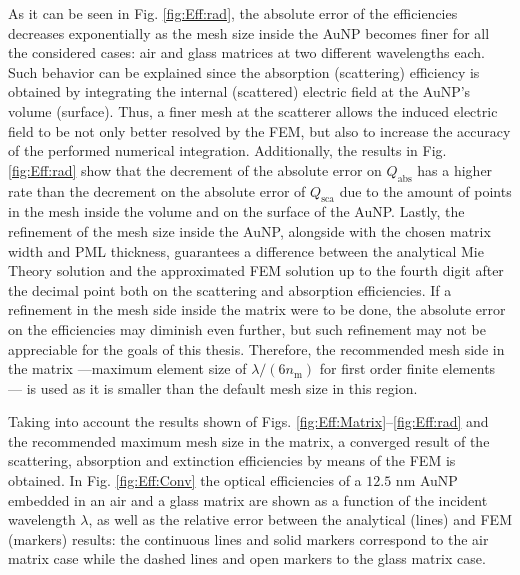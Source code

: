 As it can be seen in Fig. \ref{fig:Eff:rad}, the absolute error of the efficiencies decreases exponentially as the mesh size inside the AuNP becomes finer for all the considered cases: air and glass matrices at two different wavelengths each. Such behavior can be explained since the absorption (scattering) efficiency is obtained by integrating the internal (scattered) electric field at the AuNP's volume (surface). Thus, a finer mesh at the scatterer allows the induced electric field to be not only better resolved by the FEM, but also to increase the accuracy of the performed numerical integration. Additionally,  the results in Fig. \ref{fig:Eff:rad} show that the decrement of the absolute error on $Q_\text{abs}$ has a higher rate than the decrement on the absolute error of $Q_\text{sca}$ due to the amount of points in the mesh inside the volume and on the surface of the AuNP. Lastly, the refinement of the mesh size inside the AuNP, alongside with the chosen matrix width and PML thickness, guarantees a difference between the analytical Mie Theory solution and the approximated FEM solution up to the fourth digit after the decimal point both on the scattering and absorption efficiencies. If a refinement in the mesh side inside the matrix were to be done, the absolute error on the efficiencies may diminish even further, but such refinement may not be appreciable for the goals of this thesis. Therefore, the recommended mesh side in the matrix ---maximum element size of $\lambda/(6n_\text{m})$ for first order finite elements \cite{comsol_doc}--- is used as it is smaller than the default mesh size in this region.

Taking into account the results shown of Figs. \ref{fig:Eff:Matrix}--\ref{fig:Eff:rad} and the recommended maximum mesh size in the matrix, a converged result of the scattering, absorption and extinction efficiencies by means of the FEM is obtained. In Fig. \ref{fig:Eff:Conv} the optical efficiencies of a $12.5$ nm AuNP embedded in an air and a glass matrix are shown as a function of the incident wavelength $\lambda$, as well as the relative error between the analytical (lines) and FEM (markers) results: the continuous lines and solid markers correspond to the air matrix case while  the dashed lines and open markers to the glass matrix case.

